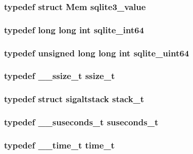 \subsubsection[{sqlite3\_\-value}]{\setlength{\rightskip}{0pt plus 5cm}typedef struct Mem {\bf sqlite3\_\-value}}\label{tp_8c_a5bc19e6eab34ccccd953717c04137d88}
\subsubsection[{sqlite\_\-int64}]{\setlength{\rightskip}{0pt plus 5cm}typedef long long int {\bf sqlite\_\-int64}}\label{tp_8c_a520a95f9080c018b2fade39885bd2e2a}
\subsubsection[{sqlite\_\-uint64}]{\setlength{\rightskip}{0pt plus 5cm}typedef unsigned long long int {\bf sqlite\_\-uint64}}\label{tp_8c_a127a9c18f6d067a05b994f5d0111ee25}
\subsubsection[{ssize\_\-t}]{\setlength{\rightskip}{0pt plus 5cm}typedef {\bf \_\-\_\-ssize\_\-t} {\bf ssize\_\-t}}\label{tp_8c_a87bd983bf349d8b86901f3200d559e8e}
\subsubsection[{stack\_\-t}]{\setlength{\rightskip}{0pt plus 5cm}typedef struct {\bf sigaltstack}  {\bf stack\_\-t}}\label{tp_8c_ab21a6d3f13d5f0d1f601969d1894b18a}
\subsubsection[{suseconds\_\-t}]{\setlength{\rightskip}{0pt plus 5cm}typedef {\bf \_\-\_\-suseconds\_\-t} {\bf suseconds\_\-t}}\label{tp_8c_a0d96f5f233948708f74f5405c787fe3c}
\subsubsection[{time\_\-t}]{\setlength{\rightskip}{0pt plus 5cm}typedef {\bf \_\-\_\-time\_\-t} {\bf time\_\-t}}\label{tp_8c_ac8234dac99fc3a2dcc8b7998afd40d49}
